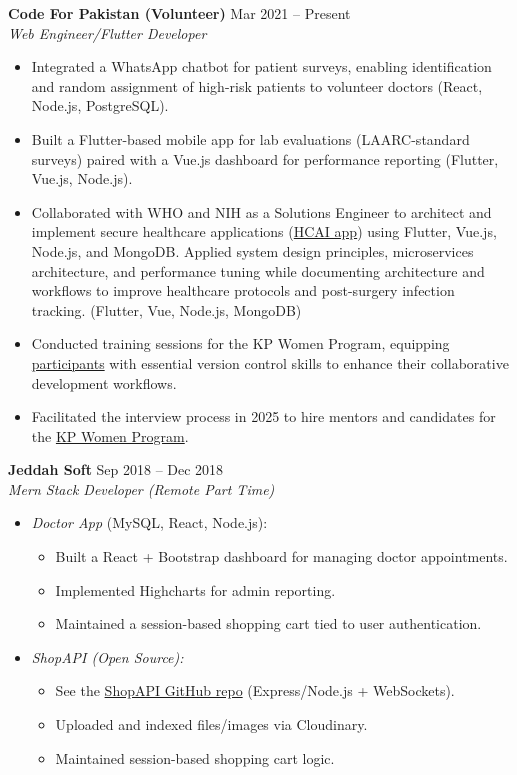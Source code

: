 \documentclass{res} %
\begin{document}
\begin{resume}
  \textbf{Code For Pakistan (Volunteer)} \hfill Mar 2021 -- Present\\
  {\sl Web Engineer/Flutter Developer}
  \begin{itemize}
    \item Integrated a WhatsApp chatbot for patient surveys, enabling identification and random assignment of high-risk patients to volunteer doctors (React, Node.js, PostgreSQL).
    \item Built a Flutter-based mobile app for lab evaluations (LAARC-standard surveys) paired with a Vue.js dashboard for performance reporting (Flutter, Vue.js, Node.js).
    \item Collaborated with WHO and NIH as a Solutions Engineer to architect and implement secure healthcare applications (\href{https://apps.apple.com/pk/app/hcai-surveillance-app/id1618890798}{HCAI app}) using Flutter, Vue.js, Node.js, and MongoDB. Applied system design principles, microservices architecture, and performance tuning while documenting architecture and workflows to improve healthcare protocols and post-surgery infection tracking. (Flutter, Vue, Node.js, MongoDB)
    \item Conducted training sessions for the KP Women Program, equipping  \href{https://github.com/codeforpakistan/first-commit}{participants} with essential version control skills to enhance their collaborative development workflows.
    \item Facilitated the interview process in 2025 to hire mentors and candidates for the  
          \href{https://codeforpakistan.org/programs/internships/kp-women}{KP Women Program}.
  \end{itemize}

  \textbf{Jeddah Soft} \hfill Sep 2018 -- Dec 2018\\
  {\sl Mern Stack Developer (Remote Part Time)}
  \begin{itemize}
    \item \emph{Doctor App} (MySQL, React, Node.js):
      \begin{itemize}
        \item Built a React + Bootstrap dashboard for managing doctor appointments.
        \item Implemented Highcharts for admin reporting.
        \item Maintained a session-based shopping cart tied to user authentication.
      \end{itemize}
    \item \emph{ShopAPI (Open Source):}
      \begin{itemize}
        \item See the \href{https://github.com/sohail0992/shopapi}{ShopAPI GitHub repo} (Express/Node.js + WebSockets).
        \item Uploaded and indexed files/images via Cloudinary.
        \item Maintained session-based shopping cart logic.
      \end{itemize}
  \end{itemize}


\end{resume}
\end{document}
